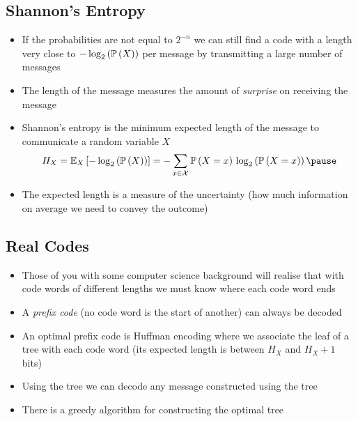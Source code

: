 
\begin{slide}
\section[-1]{Shannon's Entropy}

\begin{PauseHighLight}
  \begin{itemize}
  \item If the probabilities are not equal to $2^{-n}$ we can
    still find a code with a length very close to $-\log_2\left( \mathbb{P}\left( X \right) \right)$
    per message by transmitting a large number of messages\pause
  \item The length of the message measures the amount of
    \emph{surprise} on receiving the message\pause
  \item Shannon's entropy is the minimum expected length of the message
    to communicate a random variable $X$
    \begin{align*}
      H_X = \av[X]{-\logtwo{\Prob{X}}}
      = - \sum_{x\in\mathcal{X}} \Prob{X=x}\, \logtwo{\Prob{X=x}}\pause
    \end{align*}
  \item The expected length is a measure of the uncertainty\pause{} (how much
    information on average we need to convey the outcome)\pauseb
  \end{itemize}
\end{PauseHighLight}
  

\end{slide}


\begin{slide}
\section[-1]{Real Codes}

\begin{PauseHighLight}
  \begin{itemize}
  \item Those of you with some computer science background will
    realise that with code words of different lengths we must know
    where each code word ends\pause
  \item A \emph{prefix code} (no code word is the start of another)
    can always be decoded\pause
  \item An optimal prefix code is Huffman encoding where we
    associate the leaf of a tree with each code word\pause{} (its
    expected length is between $H_X$ and $H_X+1$ bits)\pauseb
  \item Using the tree we can decode any message constructed using the
    tree\pause
  \item There is a greedy algorithm for constructing the optimal
    tree\pause
  \end{itemize}
\end{PauseHighLight}

\end{slide}


